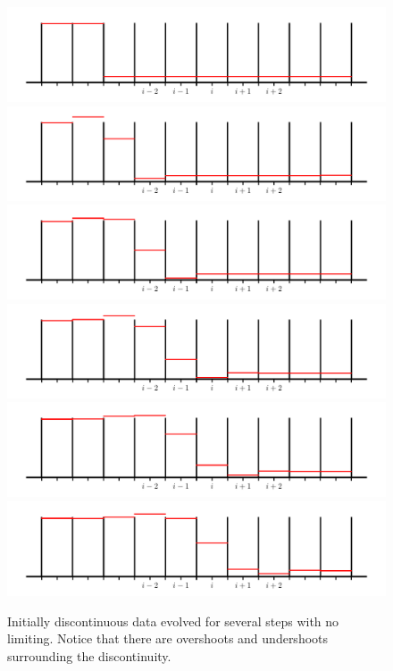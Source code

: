 \begin{figure}[h]
\centering
\includegraphics[width=0.75\linewidth]{rea-nolimit-start_001} \\
\includegraphics[width=0.75\linewidth]{rea-nolimit-start_002} \\
\includegraphics[width=0.75\linewidth]{rea-nolimit-start_003} \\
\includegraphics[width=0.75\linewidth]{rea-nolimit-start_004} \\
\includegraphics[width=0.75\linewidth]{rea-nolimit-start_005} \\
\includegraphics[width=0.75\linewidth]{rea-nolimit-start_006} 
\caption[The effect of no limiting on initially discontinuous data.]{\label{fig:limitingex}Initially discontinuous data evolved for several steps with
  no limiting.  Notice that there are overshoots and undershoots
  surrounding the discontinuity.}
\end{figure}

